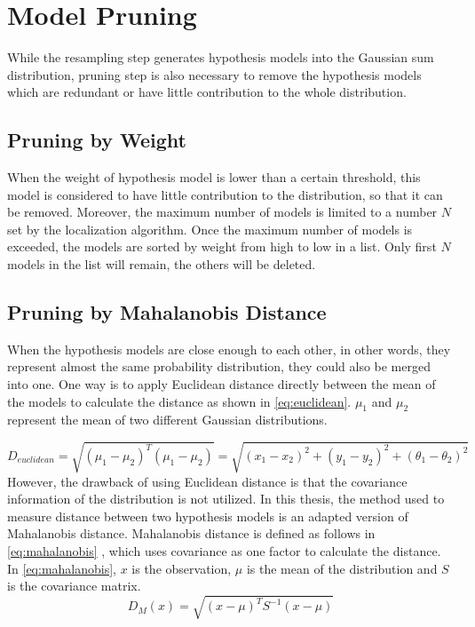 \section{Model Pruning}\label{sec:pruning}
While the resampling step generates hypothesis models into the Gaussian sum distribution, pruning step is also necessary to remove the hypothesis models which are redundant or have little contribution to the whole distribution.

\subsection{Pruning by Weight}
\label{sub:Pruning by Weight}
When the weight of hypothesis model is lower than a certain threshold, this model is considered to have little contribution to the distribution, so that it can be removed. Moreover, the maximum number of models is limited to a number $N$ set by the localization algorithm. Once the maximum number of models is exceeded, the models are sorted by weight from high to low in a list. Only first $N$ models in the list will remain, the others will be deleted.

\subsection[Pruning by Mahalanobis Distance]{Pruning by Mahalanobis Distance \cite{de2000mahalanobis}}
\label{sub:Prunning Mahalanobis Distance}
When the hypothesis models are close enough to each other, in other words, they represent almost the same probability distribution, they could also be merged into one. One way is to apply Euclidean distance directly between the mean of the models to calculate the distance as shown in \autoref{eq:euclidean}. $\mu_1$ and $\mu_2$ represent the mean of two different Gaussian distributions.

\begin{equation}
\label{eq:euclidean}
D_{euclidean} = \sqrt{(\mu_1 - \mu_2)^T(\mu_1 - \mu_2)}= \sqrt{(x_{1}-x_{2})^2 + (y_{1}-y_{2})^2 + (\theta_{1}-\theta_{2})^2}
\end{equation}
However, the drawback of using Euclidean distance is that the covariance information of the distribution is not utilized. In this thesis, 
the method used to measure distance between two hypothesis models is an adapted version of Mahalanobis distance. Mahalanobis distance is defined as follows in \autoref{eq:mahalanobis} \cite{de2000mahalanobis}, which uses covariance as one factor to calculate the distance. In \autoref{eq:mahalanobis}, $x$ is the observation, $\mu$ is the mean of the distribution and $S$ is the covariance matrix.
\begin{equation}
\label{eq:mahalanobis}
D_M(x) = \sqrt{(x - \mu)^T S^{-1} (x-\mu)}
\end{equation}

